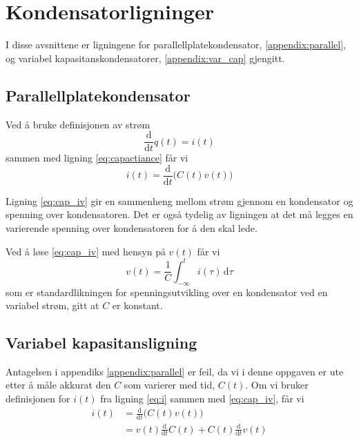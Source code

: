 
\section{Kondensatorligninger}\label{appendix:cond}
I disse avsnittene er ligningene for parallellplatekondensator, \vref{appendix:parallel}, og 
variabel kapasitanskondensatorer, \vref{appendix:var_cap} gjengitt. 
\subsection{Parallellplatekondensator}\label{appendix:parallel}
Ved å bruke definisjonen av strøm
\begin{equation}
	\frac{\mathrm{d}}{\mathrm{d}t}q(t) = i(t)
	\label{eq:i}
\end{equation}
sammen med ligning \eqref{eq:capactiance} får vi
\begin{equation}
	i(t) = \frac{\mathrm{d}}{\mathrm{d}t}\big(C(t)v(t)\big)
	\label{eq:cap_iv}
\end{equation}

Ligning \eqref{eq:cap_iv} gir en sammenheng mellom strøm gjennom en kondensator og spenning over kondensatoren. 
Det er også tydelig av ligningen at det må legges en varierende spenning 
over kondensatoren for å den skal lede. 

Ved å løse \eqref{eq:cap_iv} med hensyn på \(v(t)\) får vi
\begin{equation}
	v(t) = \frac{1}{C} \int^t_{-\infty}{i(\tau)\,\mathrm{d}\tau}
	\label{eq:cap_v}
\end{equation}
som er standardlikningen for spenningsutvikling over en kondensator ved en variabel strøm, gitt at $C$ er konstant. 

\subsection{Variabel kapasitansligning}\label{appendix:var_cap}
Antagelsen i appendiks \vref{appendix:parallel} er feil, da vi i denne oppgaven 
er ute etter å måle akkurat den \(C\) som varierer med tid, \(C(t)\). 
Om vi bruker definisjonen for \(i(t)\) fra ligning \eqref{eq:i} sammen 
med \eqref{eq:cap_iv}, får vi
\begin{align}
	i(t)  
	&= \frac{\mathrm{d}}{\mathrm{d}t} \big( C(t)v(t) \big)\label{eq:i.3}\\
	&= v(t)\frac{\mathrm{d}}{\mathrm{d}t}C(t) + C(t)\frac{\mathrm{d}}{\mathrm{d}t}v(t) \label{eq:i.4}
\end{align}

